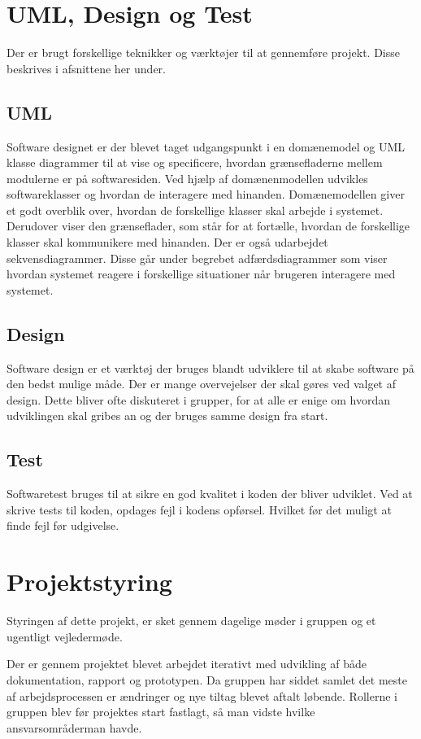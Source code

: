 \section{UML, Design og Test}
Der er brugt forskellige teknikker og værktøjer til at gennemføre projekt. Disse beskrives i afsnittene her under.
\subsection{UML}
Software designet er der blevet taget udgangspunkt i en domænemodel og UML\cite{UML} klasse diagrammer til at vise og specificere, hvordan grænsefladerne mellem modulerne er på softwaresiden.
Ved hjælp af domænenmodellen udvikles softwareklasser og hvordan de interagere med hinanden.
Domænemodellen giver et godt overblik over, hvordan de forskellige klasser skal arbejde i systemet. Derudover viser den grænseflader, som står for at fortælle, hvordan de forskellige klasser skal kommunikere med hinanden.
Der er også udarbejdet sekvensdiagrammer. Disse går under begrebet adfærdsdiagrammer som viser hvordan systemet reagere i forskellige situationer når brugeren interagere med systemet.

\subsection{Design}
Software design er et værktøj der bruges blandt udviklere til at skabe software på den bedst mulige måde. Der er mange overvejelser der skal gøres ved valget af design. Dette bliver ofte diskuteret i grupper, for at alle er enige om hvordan udviklingen skal gribes an og der bruges samme design fra start.

\subsection{Test}
Softwaretest bruges til at sikre en god kvalitet i koden der bliver udviklet. Ved at skrive tests til koden, opdages fejl i kodens opførsel. Hvilket før det muligt at finde fejl før udgivelse.
\newline

\section{Projektstyring}
Styringen af dette projekt, er sket gennem dagelige møder i gruppen og et ugentligt vejledermøde.
 
Der er gennem projektet blevet arbejdet iterativt med udvikling af både dokumentation, rapport og prototypen. Da gruppen har siddet samlet det meste af arbejdsprocessen er ændringer og nye tiltag blevet aftalt løbende.
Rollerne i gruppen blev før projektes start fastlagt, så man vidste hvilke ansvarsområderman havde.


